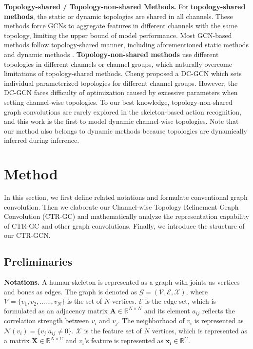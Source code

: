 \documentclass[10pt,twocolumn,letterpaper]{article}
\begin{document}
\noindent \textbf{Topology-shared / Topology-non-shared Methods.} For \textbf{topology-shared methods}, the static or dynamic topologies are shared in all channels. These methods force GCNs to aggregate features in different channels with the same topology, limiting the upper bound of model performance. Most GCN-based methods follow topology-shared manner, including aforementioned static methods \cite{huang2020spatio,liu2020disentangling,yan2018spatial} and dynamic methods \cite{li2019actional,shi2019two,ye2020dynamic,zhang2020semantics}. \textbf{Topology-non-shared methods} use different topologies in different channels or channel groups, which naturally overcome limitations of topology-shared methods. Cheng \etal \cite{cheng2020eccv} proposed a DC-GCN which sets individual parameterized topologies for different channel groups. However, the DC-GCN faces difficulty of optimization caused by excessive parameters when setting channel-wise topologies. To our best knowledge, topology-non-shared graph convolutions are rarely explored in the skeleton-based action recognition, and this work is the first to model dynamic channel-wise topologies. Note that our method also belongs to dynamic methods because topologies are dynamically inferred during inference.




\section{Method}
In this section, we first define related notations and formulate conventional graph convolution. Then we elaborate our Channel-wise Topology Refinement Graph Convolution (CTR-GC) and mathematically analyze the representation capability of CTR-GC and other graph convolutions. Finally, we introduce the structure of our CTR-GCN.

\subsection{Preliminaries}
\noindent \textbf{Notations.} A human skeleton is represented as a graph with joints as vertices and bones as edges. The graph is denoted as $\mathcal{G=(V,E,X)}$, where $\mathcal{V}=\{v_1,v_2,......,v_N\}$ is the set of $N$ vertices. $\mathcal{E}$ is the edge set, which is formulated as an adjacency matrix $\mathbf{A} \in \mathbb{R}^{N \times N}$ and its element $a_{ij}$ reflects the correlation strength between $v_i$ and $v_j$. The neighborhood of $v_i$ is represented as $\mathcal{N}(v_i)=\{v_j|a_{ij}\neq 0\}$. $\mathcal{X}$ is the feature set of $N$ vertices, which is represented as a matrix $\mathbf{X}\in \mathbb{R}^{N \times C}$ and $v_i$'s feature is represented as $\mathbf{x_i} \in \mathbb{R}^C$. 
\end{document}
